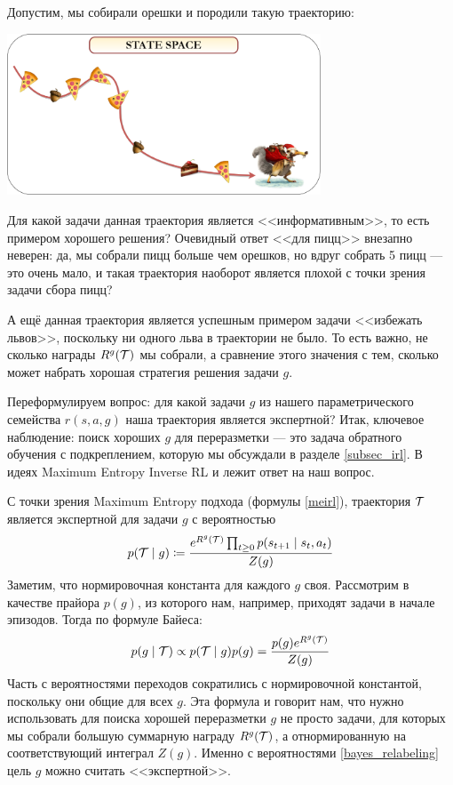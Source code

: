 \begin{exampleBox}[label=ex:multitask]{}
Допустим, мы собирали орешки и породили такую траекторию:

\begin{center}
    \includegraphics[width=0.7\textwidth]{Images/MultiTask1}
\end{center}

Для какой задачи данная траектория является <<информативным>>, то есть примером хорошего решения? Очевидный ответ <<для пицц>> внезапно неверен: да, мы собрали пицц больше чем орешков, но вдруг собрать 5 пицц --- это очень мало, и такая траектория наоборот является плохой с точки зрения задачи сбора пицц?

А ещё данная траектория является успешным примером задачи <<избежать львов>>, поскольку ни одного льва в траектории не было. То есть важно, не сколько награды $R^g(\mathcal{T})$ мы собрали, а сравнение этого значения с тем, сколько может набрать хорошая стратегия решения задачи $g$.
\end{exampleBox}

Переформулируем вопрос: для какой задачи $g$ из нашего параметрического семейства $r(s, a, g)$ наша траектория является экспертной? Итак, ключевое наблюдение: поиск хороших $g$ для переразметки --- это задача обратного обучения с подкреплением, которую мы обсуждали в разделе \ref{subsec_irl}. В идеях Maximum Entropy Inverse RL и лежит ответ на наш вопрос.

С точки зрения Maximum Entropy подхода (формулы \eqref{meirl}), траектория $\mathcal{T}$ является экспертной для задачи $g$ с вероятностью
$$p(\mathcal{T} \mid g) \coloneqq \frac{e^{R^g(\mathcal{T})} \prod_{t \ge 0}p(s_{t+1} \mid s_t, a_t)}{Z(g)}$$
Заметим, что нормировочная константа для каждого $g$ своя. Рассмотрим в качестве прайора $p(g)$, из которого нам, например, приходят задачи в начале эпизодов. Тогда по формуле Байеса:
\begin{equation}\label{bayes_relabeling}
p(g \mid \mathcal{T}) \propto p(\mathcal{T} \mid g)p(g) = \frac{p(g) e^{R^g(\mathcal{T})}}{Z(g)}
\end{equation}
Часть с вероятностями переходов сократились с нормировочной константой, поскольку они общие для всех $g$. Эта формула и говорит нам, что нужно использовать для поиска хорошей переразметки $g$ не просто задачи, для которых мы собрали большую суммарную награду $R^g(\mathcal{T})$, а отнормированную на соответствующий интеграл $Z(g)$. Именно с вероятностями \eqref{bayes_relabeling} цель $g$ можно считать <<экспертной>>.

